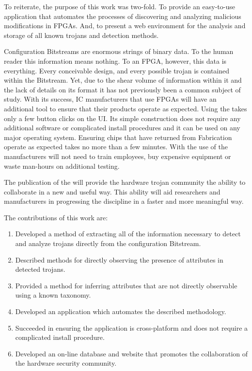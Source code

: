 \label{concl}
To reiterate, the purpose of this work was two-fold.
To provide an easy-to-use application that automates the processes of discovering and analyzing malicious modifications in \acrshort{FPGA}s.
And, to present a web environment for the analysis and storage of all known trojans and detection methods.

Configuration \gls{Bitstream}s are enormous strings of binary data.
To the human reader this information means nothing.
To an \acrshort{FPGA}, however, this data is everything.
Every conceivable design, and every possible trojan is contained within the \gls{Bitstream}.
Yet, due to the shear volume of information within it and the lack of details on its format it has not previously been a common subject of study.
With its success, \acrlong{IC} manufacturers that use \acrshort{FPGA}s will have an additional tool to ensure that their products operate as expected.
Using the \NameNoPeriod takes only a few button clicks on the \acrlong{UI}.
Its simple construction does not require any additional software or complicated install procedures and it can be used on any major operating system.
Ensuring chips that have returned from Fabrication operate as expected takes no more than a few minutes.
With the use of the \NameNoPeriod manufacturers will not need to train employees, buy expensive equipment or waste man-hours on additional testing.

The publication of the \WebNameNoPeriod will provide the hardware trojan community the ability to collaborate in a new and useful way. 
This ability will aid researchers and manufacturers in progressing the discipline in a faster and more meaningful way.

The contributions of this work are:
\begin{enumerate}
	\item Developed a method of extracting all of the information necessary to detect and analyze trojans directly from the configuration \gls{Bitstream}. 
	\item Described methods for directly observing the presence of attributes in detected trojans.
	\item Provided a method for inferring attributes that are not directly observable using a known taxonomy.
	\item Developed an application which automates the described methodology.
	\item Succeeded in ensuring the application is cross-platform and does not require a complicated install procedure.
	\item Developed an on-line database and website that promotes the collaboration of the hardware security community.
\end{enumerate}




